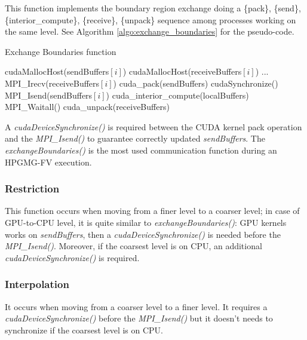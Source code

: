 \documentclass[conference]{IEEEtran}
\begin{document}
This function implements the boundary region exchange doing a \{pack\}, \{send\}, \{interior\_compute\}, \{receive\}, \{unpack\} sequence among processes working on the same level. See Algorithm \ref{algo:exchange_boundaries} for the pseudo-code.
\\
\begin{algorithm}
\small
\caption{Exchange Boundaries function}
\label{algo:exchange_boundaries}
\begin{algorithmic}[1]
\State cudaMallocHost(sendBuffers$[i]$)
\State cudaMallocHost(receiveBuffers$[i]$)
\EndFor
\State ...
 \label{alg:b}
		\State MPI\_Irecv(receiveBuffers$[i]$)    
	\EndFor
	\State cuda\_pack(sendBuffers)
	\State cudaSynchronize()
		\State MPI\_Isend(sendBuffers$[i]$)    
	\EndFor
	\State cuda\_interior\_compute(localBuffers)
	\State MPI\_Waitall()
	\State cuda\_unpack(receiveBuffers)
\EndFunction
\end{algorithmic}
\end{algorithm}

A \textit{cudaDeviceSynchronize()} is required between the CUDA kernel pack operation and the \textit{MPI\_Isend()} to guarantee correctly updated \textit{sendBuffers}.
The \textit{exchangeBoundaries()} is the most used communication function during an HPGMG-FV execution.

\subsubsection{Restriction}

This function occurs when moving from a finer level to a coarser level; in case of GPU-to-CPU level, it is quite similar to \textit{exchangeBoundaries()}: GPU kernels works on \textit{sendBuffers}, then a \textit{cudaDeviceSynchronize()} is needed before the \textit{MPI\_Isend()}. Moreover, if the coarsest level is on CPU, an additional \textit{cudaDeviceSynchronize()} is required.

\subsubsection{Interpolation}

It occurs when moving from a coarser level to a finer level. It requires a \textit{cudaDeviceSynchronize()} before the \textit{MPI\_Isend()} but it doesn't needs to synchronize if the coarsest level is on CPU.\\
\end{document}
